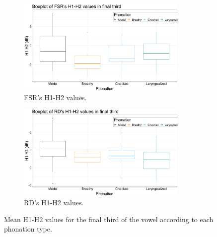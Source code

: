 \documentclass[11pt, letterpaper]{article}
\begin{document}
\begin{figure}[!ht]
	\centering
	\begin{subfigure}{.5\textwidth}
		\centering
		\includegraphics[width=0.9\textwidth]{../mean_FSR_h1h2_3rd.png}
		\caption{FSR's H1-H2 values.}
		\label{fig:FSRh1h2third} 
	\end{subfigure}%
	\begin{subfigure}{.5\textwidth}
		\centering
		\includegraphics[width=0.9\textwidth]{../mean_RD_h1h2_3rd.png}
		\caption{RD's H1-H2 values.}
		\label{fig:RDh1h2third} 
	\end{subfigure}
	\caption{Mean H1-H2 values for the final third of the vowel according to each phonation type. }
	\label{fig:h1h2third}
\end{figure}
\end{document}
